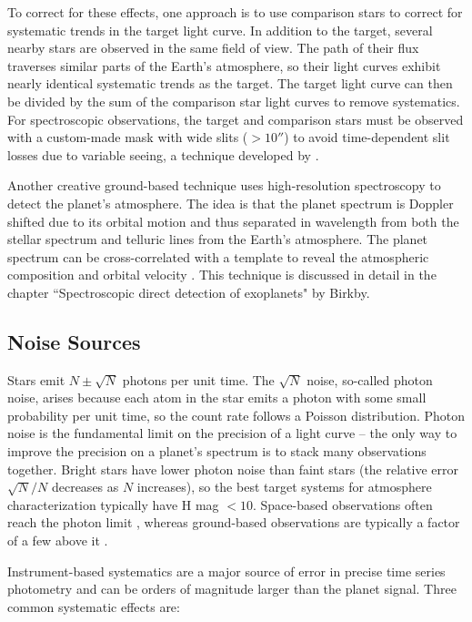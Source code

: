 \documentclass[graybox,natbib,nosecnum]{svmult}
\begin{document}
To correct for these effects, one approach is to use comparison stars to correct for systematic trends in the target light curve. In addition to the target, several nearby stars are observed in the same field of view. The path of their flux traverses similar parts of the Earth's atmosphere, so their light curves exhibit nearly identical systematic trends as the target. The target light curve can then be divided by the sum of the comparison star light curves to remove systematics.  For spectroscopic observations, the target and comparison stars must be observed with a custom-made mask with wide slits ($>10''$) to avoid time-dependent slit losses due to variable seeing, a technique developed by \cite{bean10}.

Another creative ground-based technique uses high-resolution spectroscopy to detect the planet's atmosphere.  The idea is that the planet spectrum is Doppler shifted due to its orbital motion and thus separated in wavelength from both the stellar spectrum and telluric lines from the Earth's atmosphere. The planet spectrum can be cross-correlated with a template to reveal the atmospheric composition and orbital velocity \citep[e.g.][]{snellen10}.  This technique is discussed in detail in the chapter ``Spectroscopic direct detection of exoplanets" by Birkby. 

\subsection{Noise Sources}
Stars emit $N \pm \sqrt{N}$ photons per unit time. The $\sqrt{N}$ noise, so-called photon noise, arises because each atom in the star emits a photon with some small probability per unit time, so the count rate follows a Poisson distribution. Photon noise is the fundamental limit on the precision of a light curve -- the only way to improve the precision on a planet's spectrum is to stack many observations together. Bright stars have lower photon noise than faint stars (the relative error $\sqrt{N}/N$ decreases as $N$ increases), so the best target systems for atmosphere characterization typically have H mag $< 10$.  Space-based observations often reach the photon limit \citep{sing11, deming13, ingalls16}, whereas ground-based observations are typically a factor of a few above it \citep[e.g.][]{bean13}. 

Instrument-based systematics are a major source of error in precise time series photometry and can be orders of magnitude larger than the planet signal. Three common systematic effects are: 
\end{document}
